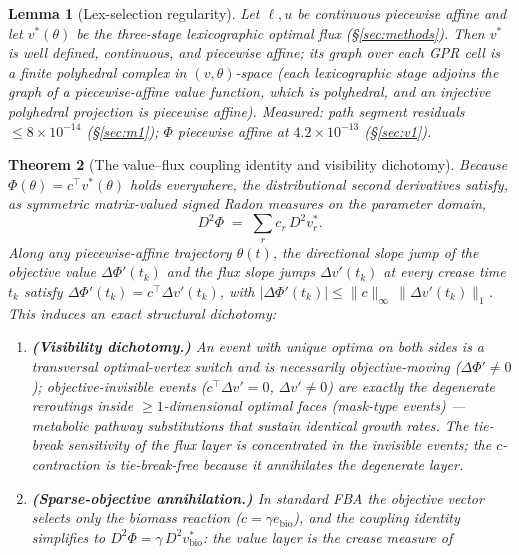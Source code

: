\documentclass[11pt,a4paper]{article}
\theoremstyle{plain}
\newtheorem{theorem}{Theorem}[section]
\newtheorem{lemma}[theorem]{Lemma}
\theoremstyle{definition}
\theoremstyle{remark}
\begin{document}
\begin{lemma}[Lex-selection regularity]\label{lem:lex}
Let $\ell, u$ be continuous piecewise affine and let $v^*(\theta)$ be
the three-stage lexicographic optimal flux (\S\ref{sec:methods}).
Then $v^*$ is well defined, continuous, and piecewise affine; its
graph over each GPR cell is a finite polyhedral complex in
$(v,\theta)$-space (each
lexicographic stage adjoins the graph of a piecewise-affine value
function, which is polyhedral, and an injective polyhedral projection
is piecewise affine). Measured: path segment residuals $\le 8 \times 10^{-14}$ (\S\ref{sec:m1}); $\Phi$ piecewise affine at $4.2 \times 10^{-13}$ (\S\ref{sec:v1}).
\end{lemma}

\begin{theorem}[The value--flux coupling identity and visibility
dichotomy]\label{thm:coupling}
Because $\Phi(\theta) = c^\top v^*(\theta)$ holds everywhere, the
distributional second derivatives satisfy, as symmetric
matrix-valued signed Radon measures on the parameter domain,
\[
D^2 \Phi \;=\; \sum_{r} c_r \, D^2 v^*_r .
\]
Along any piecewise-affine trajectory $\theta(t)$, the directional
slope jump of the objective value $\Delta\Phi'(t_k)$ and the flux
slope jumps $\Delta v'(t_k)$ at every crease time $t_k$ satisfy
$\Delta\Phi'(t_k) = c^\top \Delta v'(t_k)$, with
$|\Delta\Phi'(t_k)| \le \|c\|_\infty \,\|\Delta v'(t_k)\|_1$.
This induces an exact structural dichotomy:
\begin{enumerate}[label=(\roman*),leftmargin=2em]
\item \textbf{(Visibility dichotomy.)} An event with unique optima
      on both sides is a transversal optimal-vertex switch and is
      necessarily objective-moving ($\Delta\Phi' \neq 0$);
      objective-invisible events ($c^\top \Delta v' = 0$,
      $\Delta v' \neq 0$) are exactly the degenerate reroutings
      inside $\ge 1$-dimensional optimal faces (mask-type events) ---
      metabolic pathway substitutions that sustain identical growth
      rates. The tie-break sensitivity of the flux layer
      is concentrated in the invisible events; the $c$-contraction is
      tie-break-free because it annihilates the degenerate layer.
\item \textbf{(Sparse-objective annihilation.)} In standard FBA the
      objective vector selects only the biomass reaction ($c =
      \gamma e_{\mathrm{bio}}$), and the coupling identity
      simplifies to $D^2\Phi = \gamma\, D^2 v^*_{\mathrm{bio}}$:
      the value layer is the crease measure of

\end{enumerate}
\end{theorem}
\end{document}
